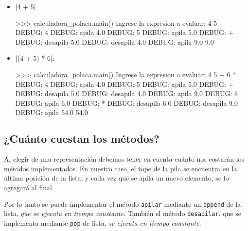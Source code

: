 \begin{itemize}
\item |4 + 5|
\begin{codigo-python-sn}
>>> calculadora_polaca.main()
Ingrese la expresion a evaluar: 4 5 +
DEBUG: 4
DEBUG: apila  4.0
DEBUG: 5
DEBUG: apila  5.0
DEBUG: +
DEBUG: desapila  5.0
DEBUG: desapila  4.0
DEBUG: apila  9.0
9.0
\end{codigo-python-sn}

\item |(4 + 5) * 6|:

\begin{codigo-python-sn}
>>> calculadora_polaca.main()
Ingrese la expresion a evaluar: 4 5 + 6 *
DEBUG: 4
DEBUG: apila  4.0
DEBUG: 5
DEBUG: apila  5.0
DEBUG: +
DEBUG: desapila  5.0
DEBUG: desapila  4.0
DEBUG: apila  9.0
DEBUG: 6
DEBUG: apila  6.0
DEBUG: *
DEBUG: desapila  6.0
DEBUG: desapila  9.0
DEBUG: apila  54.0
54.0
\end{codigo-python-sn}

\end{itemize}


\subsection{¿Cuánto cuestan los métodos?}

Al elegir de una representación debemos tener en cuenta cuánto nos costarán
los métodos implementados. En nuestro caso, el tope de la pila se encuentra
en la última posición de la lista, y cada vez que se apila un nuevo
elemento, se lo agregará al final.

Por lo tanto se puede implementar el método \lstinline!apilar! mediante un
\lstinline!append!  de la lista, \emph{que se ejecuta en tiempo constante}.
También el método \lstinline!desapilar!, que se implementa mediante
\lstinline!pop! de lista, \emph{se ejecuta en tiempo constante}.

